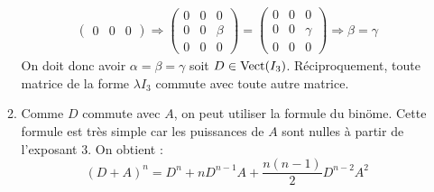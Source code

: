 \begin{enumerate}
\begin{enumerate}
\begin{align*}
\begin{pmatrix}
0 & 0 & 0
\end{pmatrix}
\Rightarrow
\begin{pmatrix}
 0 & 0 & 0\\
0 & 0 & \beta \\
0 & 0 & 0
\end{pmatrix}
=
\begin{pmatrix}
 0 & 0 & 0\\
0 & 0 & \gamma \\
0 & 0 & 0
\end{pmatrix}
\Rightarrow \beta =\gamma
\end{align*}
On doit donc avoir $\alpha=\beta=\gamma$ soit $D\in \operatorname{Vect}(I_3)$. Réciproquement, toute matrice de la forme $\lambda I_3$ commute avec toute autre matrice.
\item Comme $D$ commute avec $A$, on peut utiliser la formule du binöme. Cette formule est très simple car les puissances de $A$ sont nulles à partir de l'exposant $3$. On obtient :
\begin{displaymath}
 (D+A)^n = D^n + nD^{n-1}A + \frac{n(n-1)}{2}D^{n-2}A^2
\end{displaymath}
\end{enumerate}
\end{enumerate}
